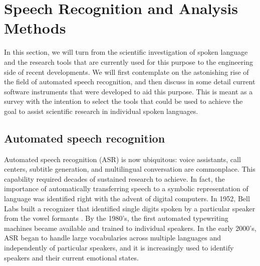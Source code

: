 \chapter{Speech Recognition and Analysis Methods}
\label{ASR}

In this section, we will turn from the scientific investigation of spoken language and the research tools that are currently used for this purpose to the engineering side of recent developments. We will first contemplate on the astonishing rise of the field of automated speech recognition, and then discuss in some detail current software instruments that were developed to aid this purpose. This is meant as a survey with the intention to select the tools that could be used to achieve the goal to assist scientific research in individual spoken languages.

\section{Automated speech recognition}

Automated speech recognition (ASR) is now ubiquitous: voice assistants, call centers, subtitle generation, and multilingual conversation are commonplace. This capability required decades of sustained research to achieve. In fact, the importance of automatically transferring speech to a symbolic representation of language was identified right with the advent of digital computers. In 1952, Bell Labs built a recognizer that identified single digits spoken by a particular speaker from the vowel formants \cite{juang2005}. By the 1980's, the first automated typewriting machines became available and trained to individual speakers. In the early 2000's, ASR began to handle large vocabularies across multiple languages and independently of particular speakers, and it is increasingly used to identify speakers and their current emotional states.

